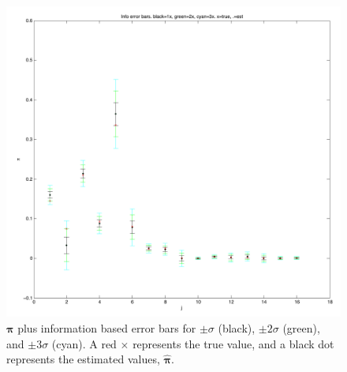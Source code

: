 \documentclass[12pt]{amsart}
\newcommand{\vect}[1]{\boldsymbol{\mathbf{#1}}}
\newcommand{\vp}{\vect{\pi}}
\newcommand{\vph}{\hat{\vect{\pi}}}
\begin{document}
\begin{figure}
	
	\begin{center}
		\includegraphics[scale=0.6]{info_error_bars.pdf}
	\end{center}
	\caption{$\vp$ plus information based error bars for $\pm \sigma$ (black), $\pm 2\sigma$ (green), and $\pm 3\sigma$ (cyan). A red $\times$ represents the true value, and a black dot represents the estimated values, $\vph$.}
\end{figure}
\end{document}
